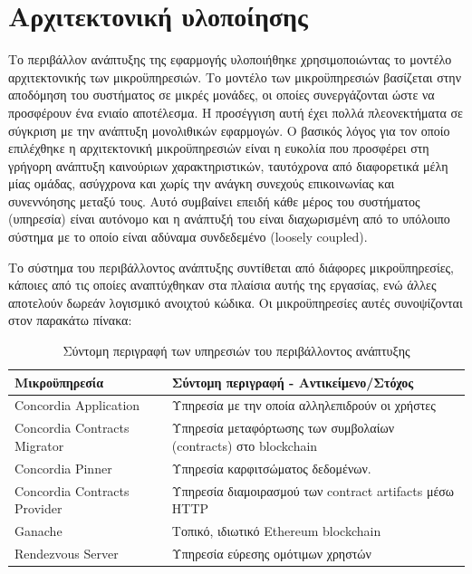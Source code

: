 \section{Αρχιτεκτονική υλοποίησης} \label{section:4-3-implementation-architecture}

Το περιβάλλον ανάπτυξης της εφαρμογής υλοποιήθηκε χρησιμοποιώντας το μοντέλο αρχιτεκτονικής των μικροϋπηρεσιών. Το μοντέλο των μικροϋπηρεσιών βασίζεται στην αποδόμηση του συστήματος σε μικρές μονάδες, οι οποίες συνεργάζονται ώστε να προσφέρουν ένα ενιαίο αποτέλεσμα. Η προσέγγιση αυτή έχει πολλά πλεονεκτήματα σε σύγκριση με την ανάπτυξη μονολιθικών εφαρμογών. %
Ο βασικός λόγος για τον οποίο επιλέχθηκε η αρχιτεκτονική μικροϋπηρεσιών είναι η ευκολία που προσφέρει στη γρήγορη ανάπτυξη καινούριων χαρακτηριστικών, ταυτόχρονα από διαφορετικά μέλη μίας ομάδας, ασύγχρονα και χωρίς την ανάγκη συνεχούς επικοινωνίας και συνεννόησης μεταξύ τους. Αυτό συμβαίνει επειδή κάθε μέρος του συστήματος (υπηρεσία) είναι αυτόνομο και η ανάπτυξή του είναι διαχωρισμένη από το υπόλοιπο σύστημα με το οποίο είναι αδύναμα συνδεδεμένο (loosely coupled).

Το σύστημα του περιβάλλοντος ανάπτυξης συντίθεται από διάφορες μικροϋπηρεσίες, κάποιες από τις οποίες αναπτύχθηκαν στα πλαίσια αυτής της εργασίας, ενώ άλλες αποτελούν δωρεάν λογισμικό ανοιχτού κώδικα. Οι μικροϋπηρεσίες αυτές συνοψίζονται στον παρακάτω πίνακα:

\begin{table}[H]
    \begin{center}
        \begin{tabularx}{\textwidth}{l X}
            \toprule
            \textbf{Μικροϋπηρεσία} & \textbf{Σύντομη περιγραφή - Αντικείμενο/Στόχος} \\
            \midrule
            Concordia Application        & Υπηρεσία με την οποία αλληλεπιδρούν οι χρήστες \\ [0.5ex]
            Concordia Contracts Migrator & Υπηρεσία μεταφόρτωσης των συμβολαίων (contracts) στο blockchain \\ [0.5ex]
            Concordia Pinner             & Υπηρεσία καρφιτσώματος δεδομένων. \\ [0.5ex]
            Concordia Contracts Provider & Υπηρεσία διαμοιρασμού των contract artifacts μέσω HTTP \\ [0.5ex]
            Ganache                      & Τοπικό, ιδιωτικό Ethereum blockchain \\ [0.5ex]
            Rendezvous Server            & Υπηρεσία εύρεσης ομότιμων χρηστών \\ [0.5ex]
            \bottomrule
        \end{tabularx}
    \end{center}
    \caption{Σύντομη περιγραφή των υπηρεσιών του περιβάλλοντος ανάπτυξης}
    \label{table:4-3-microservice-summary}
\end{table}

